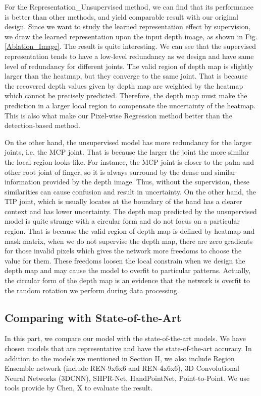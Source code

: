 \documentclass[journal]{IEEEtran}
\begin{document}
For the Representation\_Unsupervised method, we can find that its performance is better than other methods, 
and yield comparable result with our original design. 
Since we want to study the learned representation effect by supervision, 
we draw the learned representation upon the input depth image, as shown in Fig\@. \ref{Ablation_Image}.  
The result is quite interesting. 
We can see that the supervised representation tends to have a low-level redundancy as we design and have same level of redundancy for different joints. 
The valid region of depth map is slightly larger than the heatmap, but they converge to the same joint. 
That is because the recovered depth values given by depth map are weighted by the heatmap which cannot be precisely predicted. 
Therefore, the depth map must make the prediction in a larger local region to compensate the uncertainty of the heatmap. 
This is also what make our Pixel-wise Regression method better than the detection-based method. 

On the other hand, the unsupervised model has more redundancy for the larger joints, i.e. the MCP joint. 
That is because the larger the joint the more similar the local region looks like. 
For instance, the MCP joint is closer to the palm and other root joint of finger, so it is always surround by the dense and similar information provided by the depth image. 
Thus, without the supervision, these similarities can cause confusion and result in uncertainty. 
On the other hand, the TIP joint, which is usually locates at the boundary of the hand has a clearer context and has lower uncertainty. 
The depth map predicted by the unsupervised model is quite strange with a circular form and do not focus on a particular region. 
That is because the valid region of depth map is defined by heatmap and mask matrix, when we do not supervise the depth map, 
there are zero gradients for those invalid pixels which gives the network more freedoms to choose the value for them. 
These freedoms loosen the local constrain when we design the depth map and may cause the model to overfit to particular patterns. 
Actually, the circular form of the depth map is an evidence that the network is overfit to the random rotation we perform during data processing.

\subsection{Comparing with State-of-the-Art}

In this part, we compare our model with the state-of-the-art models. 
We have chosen models that are representative and have the state-of-the-art accuracy. 
In addition to the models we mentioned in Section II, we also include 
Region Ensemble network (include REN-9x6x6\cite{wang2018region} and REN-4x6x6\cite{guo2017region}), 
3D Convolutional Neural Networks (3DCNN\cite{ge20173d}), 
SHPR-Net\cite{chen2018shpr}, 
HandPointNet\cite{ge2018hand}, 
Point-to-Point\cite{ge2018point}. 
We use tools provide by Chen, X\cite{chen2017pose} to evaluate the result.   
\end{document}
